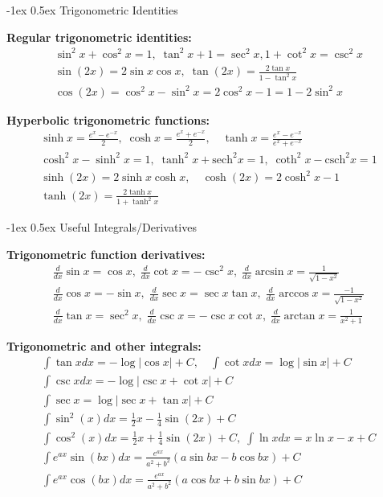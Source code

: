 \documentclass[10pt,landscape]{article}
\makeatletter
\renewcommand{\section}{\@startsection{section}{1}{0mm}%
                                {-1ex}%
                                {0.5ex}%
                                {\normalfont\large\bfseries}}
\makeatother
\begin{document}
\begin{multicols}{3}
\section{Trigonometric Identities}
\par \textbf{Regular trigonometric identities:}
\begin{gather*}
\sin^2 x + \cos^2 x = 1, \; \tan^2 x + 1 = \sec^2 x, 1 + \cot^2 x = \csc^2 x \\
\sin (2x) = 2 \sin x \cos x, \; \tan(2x) = \frac{ 2 \tan x}{1 - \tan^2 x}\\
\cos (2x) = \cos^2 x - \sin^2 x = 2 \cos^2 x - 1 = 1 - 2 \sin^2 x
\end{gather*}

\par \textbf{Hyperbolic trigonometric functions:}
\begin{gather*}
\sinh x = \frac{ e^x - e^{-x}}{2}, \; \cosh x = \frac{ e^x + e^{-x}}{2}, \quad \tanh x  = \frac{e^x - e^{-x}}{e^x + e^{-x}} \\
\cosh^2 x - \sinh^2 x = 1, \; \tanh^2 x + \text{sech}^2 x = 1, \; \coth^2 x - \text{csch}^2 x = 1 \\
\sinh(2x) = 2 \sinh x \cosh x, \quad \cosh(2x) = 2 \cosh^2 x - 1\\
\tanh(2x) = \frac{ 2 \tanh x}{1 + \tanh^2 x}
\end{gather*}

\section{Useful Integrals/Derivatives}
\par \textbf{Trigonometric function derivatives:}
\begin{gather*}
\frac{d}{dx} \sin x = \cos x, \; \frac{d}{dx} \cot x = - \csc^2 x , \; \frac{d}{dx}\arcsin x = \frac{1}{\sqrt{1 - x^2}}\\
\frac{d}{dx}\cos x = - \sin x , \;\frac{d}{dx}\sec x = \sec x \tan x, \; \frac{d}{dx}\arccos x = \frac{ -1}{\sqrt{1 - x^2}}\\
\frac{d}{dx} \tan x = \sec^2 x , \; \frac{d}{dx} \csc x = - \csc x \cot x, \; \frac{d}{dx}\arctan x = \frac{1}{x^2 +1}
\end{gather*}

\par \textbf{Trigonometric and other integrals:}
\begin{gather*}
\int \tan x dx = - \log|\cos x| + C, \quad \int \cot x dx = \log | \sin x | + C \\
\int \csc x dx = - \log |\csc x + \cot x| + C \\
\int \sec x = \log |\sec x + \tan x| + C\\
\int \sin^2(x) dx = \frac{1}{2}x - \frac{1}{4} \sin(2x) + C \\
\int \cos^2(x)dx = \frac{1}{2} x + \frac{1}{4} \sin(2x) + C, \; \int \ln x dx = x \ln x - x + C \\
\int e^{ax} \sin (bx)dx = \frac{e^{ax}}{a^2 + b^2}(a \sin bx - b \cos bx) + C \\
\int e^{ax} \cos (bx)dx = \frac{e^{ax}}{a^2 + b^2}(a \cos bx + b \sin bx) + C 
\end{gather*}


\end{multicols}
\end{document}
